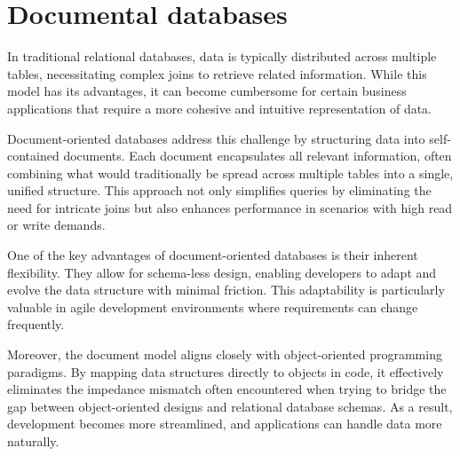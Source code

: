 \section{Documental databases}

In traditional relational databases, data is typically distributed across multiple tables, necessitating complex joins to retrieve related information.
While this model has its advantages, it can become cumbersome for certain business applications that require a more cohesive and intuitive representation of data.

Document-oriented databases address this challenge by structuring data into self-contained documents. 
Each document encapsulates all relevant information, often combining what would traditionally be spread across multiple tables into a single, unified structure. 
This approach not only simplifies queries by eliminating the need for intricate joins but also enhances performance in scenarios with high read or write demands.

One of the key advantages of document-oriented databases is their inherent flexibility. 
They allow for schema-less design, enabling developers to adapt and evolve the data structure with minimal friction. 
This adaptability is particularly valuable in agile development environments where requirements can change frequently.

Moreover, the document model aligns closely with object-oriented programming paradigms. 
By mapping data structures directly to objects in code, it effectively eliminates the impedance mismatch often encountered when trying to bridge the gap between object-oriented designs and relational database schemas. 
As a result, development becomes more streamlined, and applications can handle data more naturally.


